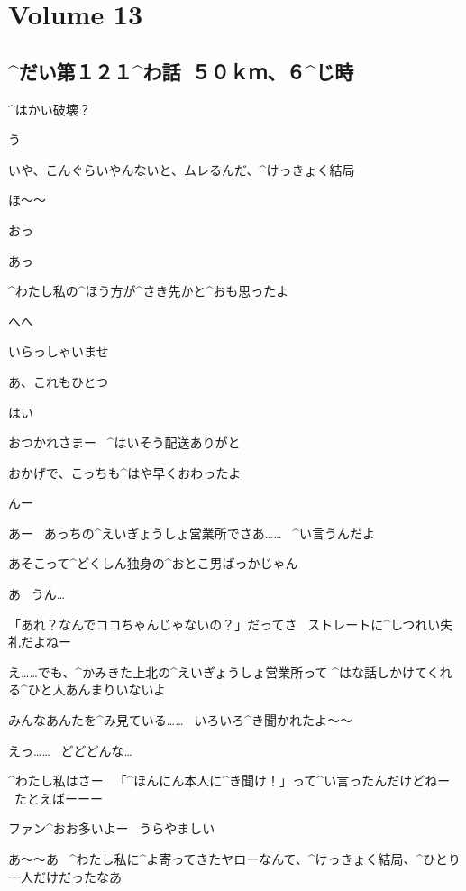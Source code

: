 \section{Volume 13}

\subsection{^{だい}{第}１２１^{わ}{話}\ ５０ｋｍ、６^{じ}{時}}

\page[5]
\Makki ^{はかい}{破壊}？

\Alpha う

\Alpha いや、こんぐらいやんないと、ムレるんだ、^{けっきょく}{結局}

\Makki ほ〜〜

\page[7]
\Shiba おっ

\Kokone あっ

\Shiba ^{わたし}{私}の^{ほう}{方}が^{さき}{先}かと^{おも}{思}ったよ

\Kokone へへ

\Person いらっしゃいませ

\Shiba あ、これもひとつ

\Person はい

\page
\Kokone おつかれさまー
\ ^{はいそう}{配送}ありがと

\Kokone おかげで、こっちも^{はや}{早}くおわったよ

\Shiba んー

\Shiba あー
\ あっちの^{えいぎょうしょ}{営業所}でさあ……
\ ^{い}{言}うんだよ

\Shiba あそこって^{どくしん}{独身}の^{おとこ}{男}ばっかじゃん

\Kokone あ
\ うん…

\Shiba 「あれ？なんでココちゃんじゃないの？」だってさ
\ ストレートに^{しつれい}{失礼}だよねー

\page
\Kokone え……でも、^{かみきた}{上北}の^{えいぎょうしょ}{営業所}って
^{はな}{話}しかけてくれる^{ひと}{人}あんまりいないよ

\Shiba みんなあんたを^{み}{見}ている……
\ いろいろ^{き}{聞}かれたよ〜〜

\Kokone えっ……
\ どどどんな…

\Shiba ^{わたし}{私}はさー
\ 「^{ほんにん}{本人}に^{き}{聞}け！」って^{い}{言}ったんだけどねー
\ たとえばーーー

\page
\Shiba ファン^{おお}{多}いよー
\ うらやましい

\Shiba あ〜〜あ
\ ^{わたし}{私}に^{よ}{寄}ってきたヤローなんて、^{けっきょく}{結局}、^{ひとり}{一人}だけだったなあ


